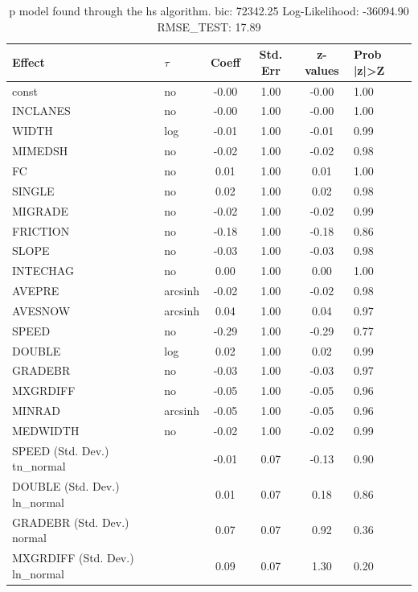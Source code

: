 \begin{table}
	\caption{p model found through the hs algorithm. bic: 72342.25 Log-Likelihood: -36094.90 RMSE_TEST: 17.89}
	\begin{center}
		\begin{tabular}{|l|l|c|c|c|l|}
			\hline
			Effect & $\tau$ & Coeff & Std. Err & z-values & Prob |z|>Z \\
			\hline
			const & no & -0.00 & 1.00 & -0.00 & 1.00 \\
			\hline
			INCLANES & no & -0.00 & 1.00 & -0.00 & 1.00 \\
			\hline
			WIDTH & log & -0.01 & 1.00 & -0.01 & 0.99 \\
			\hline
			MIMEDSH & no & -0.02 & 1.00 & -0.02 & 0.98 \\
			\hline
			FC & no & 0.01 & 1.00 & 0.01 & 1.00 \\
			\hline
			SINGLE & no & 0.02 & 1.00 & 0.02 & 0.98 \\
			\hline
			MIGRADE & no & -0.02 & 1.00 & -0.02 & 0.99 \\
			\hline
			FRICTION & no & -0.18 & 1.00 & -0.18 & 0.86 \\
			\hline
			SLOPE & no & -0.03 & 1.00 & -0.03 & 0.98 \\
			\hline
			INTECHAG & no & 0.00 & 1.00 & 0.00 & 1.00 \\
			\hline
			AVEPRE & arcsinh & -0.02 & 1.00 & -0.02 & 0.98 \\
			\hline
			AVESNOW & arcsinh & 0.04 & 1.00 & 0.04 & 0.97 \\
			\hline
			SPEED & no & -0.29 & 1.00 & -0.29 & 0.77 \\
			\hline
			DOUBLE & log & 0.02 & 1.00 & 0.02 & 0.99 \\
			\hline
			GRADEBR & no & -0.03 & 1.00 & -0.03 & 0.97 \\
			\hline
			MXGRDIFF & no & -0.05 & 1.00 & -0.05 & 0.96 \\
			\hline
			MINRAD & arcsinh & -0.05 & 1.00 & -0.05 & 0.96 \\
			\hline
			MEDWIDTH & no & -0.02 & 1.00 & -0.02 & 0.99 \\
			\hline
			SPEED (Std. Dev.) tn_normal &  & -0.01 & 0.07 & -0.13 & 0.90 \\
			\hline
			DOUBLE (Std. Dev.) ln_normal &  & 0.01 & 0.07 & 0.18 & 0.86 \\
			\hline
			GRADEBR (Std. Dev.) normal &  & 0.07 & 0.07 & 0.92 & 0.36 \\
			\hline
			MXGRDIFF (Std. Dev.) ln_normal &  & 0.09 & 0.07 & 1.30 & 0.20 \\

\end{tabular}
\end{center}
\end{table}
